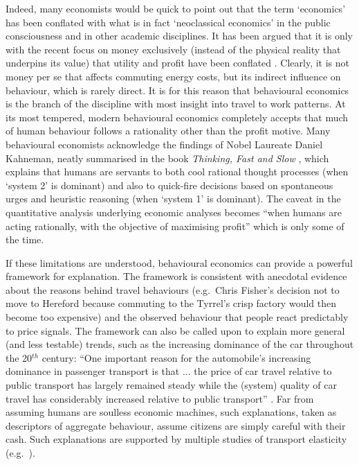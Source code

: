 Indeed, many economists would be quick to point out that the term `economics'
has been conflated with what is in fact `neoclassical economics' in the public
consciousness and in other academic disciplines.
It has been argued that it is only with the recent
focus on money exclusively (instead of the physical reality that underpins
its value) that utility and profit have been conflated \citep{porritt2007capitalism,
Eisenstein2011}.
Clearly, it is not money per se that affects commuting energy costs, but
its indirect influence on behaviour, which is rarely direct. It is for this
reason that behavioural economics is the
branch of the discipline with most insight into travel to work patterns.
At its most tempered, modern behavioural economics completely accepts that much
of human behaviour follows a rationality other than the profit
motive. Many behavioural economists acknowledge the findings of Nobel
Laureate Daniel Kahneman, neatly summarised in the
book \emph{Thinking, Fast and Slow} \citep{Kahneman2012}, which
explains that humans are servants to both cool rational thought processes
(when `system 2' is dominant) and also to quick-fire decisions based on
spontaneous urges and heuristic reasoning (when `system 1' is dominant). The
caveat in the quantitative analysis underlying economic analyses
becomes ``when humans are acting
rationally, with the objective of maximising profit'' which is only some of the
time.

If these limitations are understood, behavioural economics can provide a powerful
framework for explanation. The
framework is consistent with anecdotal evidence about the reasons behind travel
behaviours (e.g.~Chris Fisher's decision not to move to Hereford because
commuting to the Tyrrel's crisp factory would then become too expensive) and
the observed behaviour that people react predictably to price signals.
The framework can also be called upon to explain more general (and less
testable) trends, such as the increasing dominance of the car throughout the
20$^{th}$ century: ``One important reason for the automobile's increasing
dominance in passenger transport is that ... the price of car travel relative
to public transport has largely remained steady while the (system) quality of
car travel has considerably increased relative to public transport''
\citep[p.~149]{Exel2011-b-ec}. %
Far from assuming humans are soulless economic machines,
such explanations, taken as descriptors of aggregate behaviour,
assume citizens are simply careful with their cash.
Such explanations are supported by multiple studies of transport elasticity
(e.g.~\citealp{goodwin2004elasticities}).

